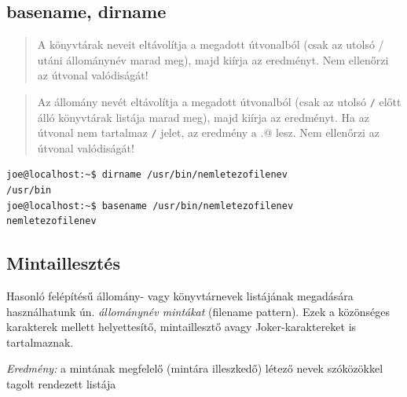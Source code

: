 %

\subsection{basename, dirname}

\begin{quotation}
A könyvtárak neveit eltávolítja a megadott útvonalból (csak az utolsó / utáni állománynév marad meg), majd kiírja az eredményt. Nem ellenőrzi az útvonal valódiságát!
\end{quotation}

\noindent{}
\begin{quotation}
Az állomány nevét eltávolítja a megadott útvonalból (csak az utolsó \verb./. előtt álló könyvtárak listája marad meg), majd kiírja az eredményt. Ha az útvonal nem tartalmaz \verb./. jelet, az eredmény a \verb@.@ lesz. Nem ellenőrzi az útvonal valódiságát!
\end{quotation}

\begin{lstlisting}
joe@localhost:~$ dirname /usr/bin/nemletezofilenev
/usr/bin
joe@localhost:~$ basename /usr/bin/nemletezofilenev
nemletezofilenev
\end{lstlisting}



\subsection{Mintaillesztés}
Hasonló felépítésű állomány- vagy könyvtárnevek listájának megadására használhatunk ún. \textit{állománynév mintákat} (filename pattern). Ezek a közönséges karakterek mellett helyettesítő, mintaillesztő avagy Joker-karaktereket is tartalmaznak.
\medskip

\textit{Eredmény:} a mintának megfelelő (mintára illeszkedő) létező nevek szóközökkel tagolt rendezett listája

